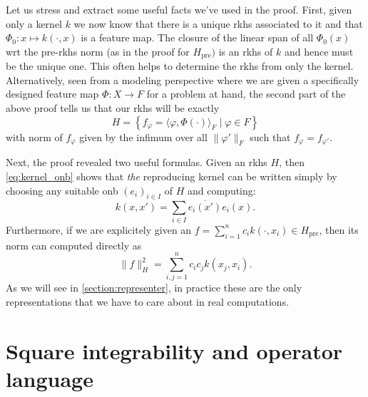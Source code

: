 
Let us stress and extract some useful facts we've used in the proof.
First, given only a kernel $k$ we now know that there is a unique rkhs
associated to it and that $\Phi_0 \colon x \mapsto k(\cdot,x)$ is a 
feature map.
The closure of the linear span of all $\Phi_0(x)$ wrt the 
pre-rkhs norm (as in the proof for $H_{\textrm{pre}})$ is 
an rkhs of $k$ and hence must be the unique one.
This often helps to determine the rkhs from only the kernel.
Alternatively, seen from a modeling perspective where
we are given a specifically designed feature 
map $\Phi \colon X \to F$ for a problem at hand, 
the second part of the above proof tells us that our
rkhs will be exactly
\begin{equation*}
    H = \left\{ f_\varphi = \langle \varphi,\Phi(\cdot) \rangle_F 
    \mid \varphi \in F \right\}
\end{equation*}
with norm of $f_\varphi$ given by the infimum over all $\|\varphi'\|_F$
such that $f_\varphi = f_{\varphi'}$.

Next, the proof revealed two useful formulas.
Given an rkhs $H$, then \cref{eq:kernel_onb} shows that \emph{the} 
reproducing kernel can be written simply by choosing any suitable onb 
$(e_i)_{i \in I}$ of $H$ and computing:
\begin{equation*}
    k(x,x') = \sum_{i \in I} \overline{e_i(x')} e_i(x).
\end{equation*}
Furthermore, if we are explicitely given an 
$f = \sum_{i=1}^n c_i k(\cdot,x_i) \in H_{\textrm{pre}}$,
then its norm can computed directly as 
\begin{equation*}
    \| f \|^2_H = \sum_{i,j = 1}^n c_i c_j k(x_j,x_i).
\end{equation*}
As we will see in \cref{section:representer}, 
in practice these are the only representations that we have to care 
about in real computations.

\section{Square integrability and operator language}

